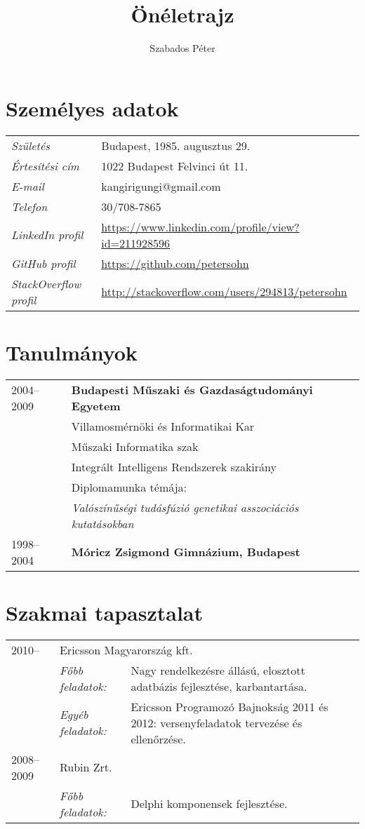 \documentclass[a4paper,10pt]{article}
\title{\textbf{Önéletrajz}}
\author{Szabados Péter}
\newcommand{\pont}[1]{\emph{#1}}
\begin{document}
\maketitle

\section*{Személyes adatok}
\begin{tabular}{ll}
 \pont{Születés}&Budapest, 1985. augusztus 29.\\
 \pont{Értesítési cím}&1022 Budapest Felvinci út 11.\\
 \pont{E-mail}&kangirigungi@gmail.com\\
 \pont{Telefon}&30/708-7865\\
 \pont{LinkedIn profil}&\href{https://www.linkedin.com/profile/view?id=211928596}{https://www.linkedin.com/profile/view?id=211928596}\\
 \pont{GitHub profil}&\href{https://github.com/petersohn}{https://github.com/petersohn}\\
 \pont{StackOverflow profil}&\href{http://stackoverflow.com/users/294813/petersohn}{http://stackoverflow.com/users/294813/petersohn}\\
\end{tabular}

\section*{Tanulmányok}
\begin{tabular}{ll}
 2004--2009
  &\textbf{Budapesti Műszaki és Gazdaságtudományi Egyetem}\\
  &Villamosmérnöki és Informatikai Kar\\
  &Műszaki Informatika szak\\
  &Integrált Intelligens Rendszerek szakirány\\
  &Diplomamunka témája:\\
  &\emph{Valószínűségi tudásfúzió genetikai asszociációs kutatásokban}\\
  1998--2004&\textbf{Móricz Zsigmond Gimnázium, Budapest}
\end{tabular}

\section*{Szakmai tapasztalat}
\begin{tabular}{llp{10cm}}
 2010--&\multicolumn{2}{l}{Ericsson Magyarország kft.}\\
  &\emph{Főbb feladatok:}&Nagy rendelkezésre állású, elosztott adatbázis fejlesztése, karbantartása.\\
  &\emph{Egyéb feladatok:}&Ericsson Programozó Bajnokság 2011 és 2012: versenyfeladatok tervezése és ellenőrzése.\\
 2008--2009&\multicolumn{2}{l}{Rubin Zrt.}\\
  &\emph{Főbb feladatok:}&Delphi komponensek fejlesztése.
\end{tabular}
\end{document}

